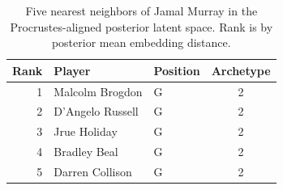 \begin{table}[htbp]
  \centering\small
  \begin{tabular}{rllc}
    \toprule
    Rank & Player & Position & Archetype \\
    \midrule
    1 & Malcolm Brogdon & G & 2 \\
    2 & D'Angelo Russell & G & 2 \\
    3 & Jrue Holiday & G & 2 \\
    4 & Bradley Beal & G & 2 \\
    5 & Darren Collison & G & 2 \\
    \bottomrule
  \end{tabular}
  \caption{Five nearest neighbors of Jamal Murray in the Procrustes-aligned posterior latent space. Rank is by posterior mean embedding distance.}
  \label{tab:Jamal_Murray_neighbors}
\end{table}

